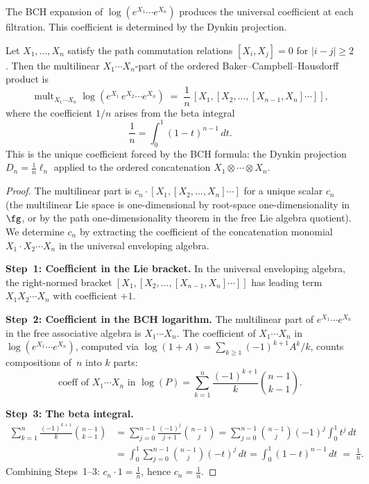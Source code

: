 The BCH expansion of $\log(e^{X_1}\cdots e^{X_n})$ produces the
universal coefficient at each filtration. This coefficient is
determined by the Dynkin projection.

\begin{theorem}
\label{thm:dynkin-beta-integral}
Let $X_1,\ldots,X_n$ satisfy the path commutation relations
$[X_i,X_j]=0$ for $|i-j|\ge 2$. Then the multilinear
$X_1\cdots X_n$-part of the ordered Baker--Campbell--Hausdorff product is
\[
\operatorname{mult}_{X_1\cdots X_n}
\log(e^{X_1}\,e^{X_2}\cdots e^{X_n})
\;=\;
\frac{1}{n}\,[X_1,[X_2,\ldots,[X_{n-1},X_n]\cdots]],
\]
where the coefficient $1/n$ arises from the beta integral
\begin{equation}\label{eq:beta-integral-coeff}
\frac{1}{n}=\int_0^1(1-t)^{n-1}\,dt.
\end{equation}
This is the unique coefficient forced by the BCH formula: the Dynkin
projection $D_n=\frac{1}{n}\ell_n$ applied to the ordered
concatenation $X_1\otimes\cdots\otimes X_n$.
\end{theorem}

\begin{proof}
The multilinear part is $c_n\cdot[X_1,[X_2,\ldots,X_n]\cdots]$ for a
unique scalar $c_n$ (the multilinear Lie space is one-dimensional by
root-space one-dimensionality in $\fg$, or by the path
one-dimensionality theorem in the free Lie algebra quotient). We
determine $c_n$ by extracting the coefficient of the concatenation
monomial $X_1\cdot X_2\cdots X_n$ in the universal enveloping algebra.

\medskip\noindent\textbf{Step~1: Coefficient in the Lie bracket.}
In the universal enveloping algebra, the right-normed bracket
$[X_1,[X_2,\ldots,[X_{n-1},X_n]\cdots]]$ has leading term
$X_1 X_2\cdots X_n$ with coefficient $+1$.

\medskip\noindent\textbf{Step~2: Coefficient in the BCH logarithm.}
The multilinear part of $e^{X_1}\cdots e^{X_n}$ in the free
associative algebra is $X_1\cdots X_n$. The coefficient of
$X_1\cdots X_n$ in $\log(e^{X_1}\cdots e^{X_n})$, computed via
$\log(1+A)=\sum_{k\ge 1}(-1)^{k+1}A^k/k$, counts compositions
of~$n$ into $k$ parts:
\[
\text{coeff of }X_1\cdots X_n\text{ in }\log(P)
=
\sum_{k=1}^{n}\frac{(-1)^{k+1}}{k}\binom{n-1}{k-1}.
\]

\medskip\noindent\textbf{Step~3: The beta integral.}
\begin{align*}
\sum_{k=1}^{n}\frac{(-1)^{k+1}}{k}\binom{n-1}{k-1}
&=
\sum_{j=0}^{n-1}\frac{(-1)^{j}}{j+1}\binom{n-1}{j}
=
\sum_{j=0}^{n-1}\binom{n-1}{j}(-1)^j\int_0^1 t^j\,dt\\
&=
\int_0^1\sum_{j=0}^{n-1}\binom{n-1}{j}(-t)^j\,dt
=
\int_0^1(1-t)^{n-1}\,dt
\;=\;\frac{1}{n}.
\end{align*}
Combining Steps~1--3: $c_n\cdot 1=\frac{1}{n}$, hence
$c_n=\frac{1}{n}$.
\end{proof}

